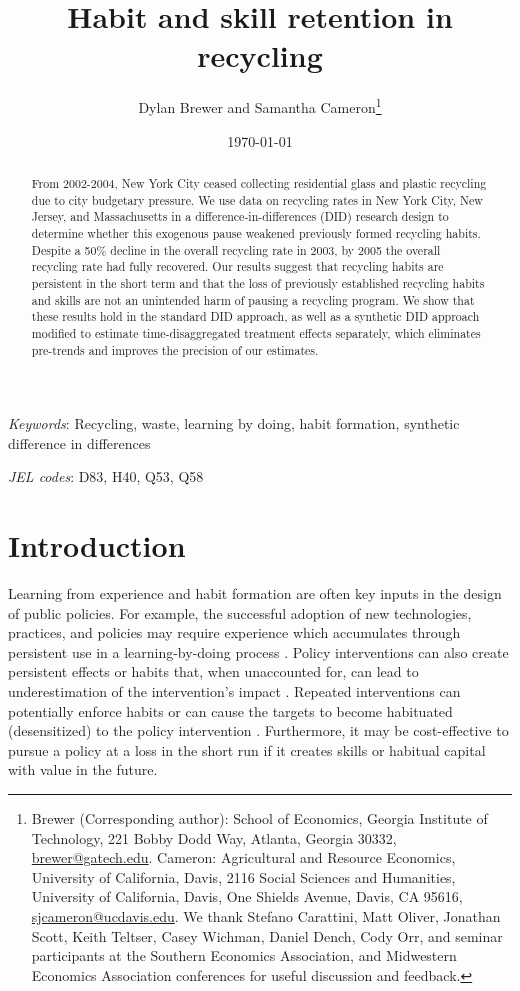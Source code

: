\documentclass[12pt]{article}
\title{Habit and skill retention in recycling}
\author{Dylan Brewer and Samantha Cameron\thanks{Brewer (Corresponding author): School of Economics, Georgia Institute of Technology, 221 Bobby Dodd Way, Atlanta, Georgia 30332, \href{mailto:brewer@gatech.edu}{brewer@gatech.edu}.  Cameron: Agricultural and Resource Economics, University of California, Davis, 2116 Social Sciences and Humanities, University of California, Davis, One Shields Avenue, Davis, CA 95616, \href{mailto:sjcameron@ucdavis.edu}{sjcameron@ucdavis.edu}.  We thank Stefano Carattini, Matt Oliver, Jonathan Scott, Keith Teltser, Casey Wichman, Daniel Dench, Cody Orr, and seminar participants at the Southern Economics Association, and Midwestern Economics Association conferences for useful discussion and feedback.}}
\date{\today}
\begin{document}
\maketitle

\begin{abstract}
\begin{singlespace}
\noindent
From 2002-2004, New York City ceased collecting residential glass and plastic recycling due to city budgetary pressure.  We use data on recycling rates in New York City, New Jersey, and Massachusetts in a difference-in-differences (DID) research design to determine whether this exogenous pause weakened previously formed recycling habits.  Despite a 50\% decline in the overall recycling rate in 2003, by 2005 the overall recycling rate had fully recovered.  Our results suggest that recycling habits are persistent in the short term and that the loss of previously established recycling habits and skills are not an unintended harm of pausing a recycling program.  We show that these results hold in the standard DID approach, as well as a synthetic DID approach modified to estimate time-disaggregated treatment effects separately, which eliminates pre-trends and improves the precision of our estimates.
\end{singlespace}
\end{abstract}
\noindent \textit{Keywords}: Recycling, waste, learning by doing, habit formation, synthetic difference in differences

\noindent \textit{JEL codes}: D83, H40, Q53, Q58

\clearpage

\section{Introduction}

Learning from experience and habit formation are often key inputs in the design of public policies.  For example, the successful adoption of new technologies, practices, and policies may require experience which accumulates through persistent use in a learning-by-doing process \citep{fosterrosenzweig1995}.  Policy interventions can also create persistent effects or habits that, when unaccounted for, can lead to underestimation of the intervention's impact \citep{allcottrogers2014}.  Repeated interventions can potentially enforce habits or can cause the targets to become habituated (desensitized) to the policy intervention \citep{itoidatanaka2018}.  Furthermore, it may be cost-effective to pursue a policy at a loss in the short run if it creates skills or habitual capital with value in the future.
\end{document}
